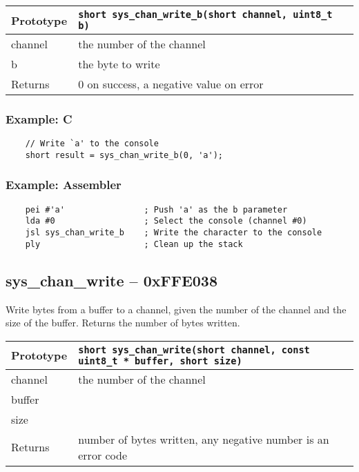 \bigskip

\begin{tabular}{|l||l|} \hline
Prototype & \lstinline!short sys_chan_write_b(short channel, uint8_t b)! \\ \hline
channel & the number of the channel \\ \hline
b & the byte to write \\ \hline
Returns & 0 on success, a negative value on error \\ \hline
\end{tabular}

\subsubsection*{Example: C}
\begin{lstlisting}
    // Write `a' to the console
    short result = sys_chan_write_b(0, 'a');
\end{lstlisting}

\subsubsection*{Example: Assembler}
\begin{verbatim}
    pei #'a'                ; Push 'a' as the b parameter
    lda #0                  ; Select the console (channel #0)
    jsl sys_chan_write_b    ; Write the character to the console
    ply                     ; Clean up the stack
\end{verbatim}

\subsection*{sys\_chan\_write -- 0xFFE038}
Write bytes from a buffer to a channel, given the number of the channel and the size of the buffer. Returns the number of bytes written.

\bigskip

\begin{tabular}{|l||l|} \hline
Prototype & \lstinline!short sys_chan_write(short channel, const uint8_t * buffer, short size)! \\ \hline
channel & the number of the channel \\ \hline
buffer &  \\ \hline
size &  \\ \hline
Returns & number of bytes written, any negative number is an error code \\ \hline
\end{tabular}

